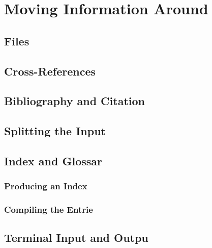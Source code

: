 \section{Moving Information Around}
\subsection{Files}


\subsection{Cross-References}


\subsection{Bibliography and Citation}


\subsection{Splitting the Input}


\subsection{Index and Glossar}
\subsubsection{Producing an Index}
\subsubsection{Compiling the Entrie}


\subsection{Terminal Input and Outpu}